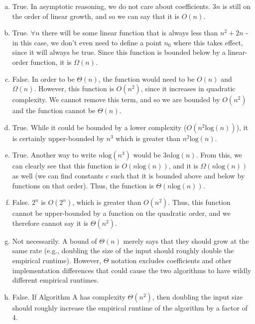 \documentclass[11pt]{article}
\begin{document}
\begin{enumerate}[(a)]
    	\item True. In asymptotic reasoning, we do not care about coefficients.
            $3n$ is still on the order of linear growth, and so we can say that
            it is $O(n)$.
	\item True. $\forall n$ there will be some linear function that is 
            always less than $n^2 + 2n$ - in this case, we don't even need to
            define a point $n_0$ where this takes effect, since it will always 
            be true. Since this function is bounded below by a linear-order
            function, it is $\Omega(n)$.
	\item False. In order to be $\Theta(n)$, the function would need to be
            $O(n)$ and $\Omega(n)$. However, this function is $O(n^2)$, since 
            it increases in quadratic complexity. We cannot remove this term, 
            and so we are bounded by $O(n^2)$ and the function cannot be
            $\Theta(n)$.
	\item True. While it could be bounded by a lower complexity
            ($O(n^2\text{log}(n))$), it is certainly upper-bounded by $n^3$ 
            which is greater than $n^2\text{log}(n)$.
    \item True. Another way to write $n\text{log}(n^3)$ would be
        $3n\text{log}(n)$. From this, we can clearly see that this function is
        $O(n\text{log}(n))$, and it is $\Omega(n\text{log}(n))$ as well (we can
        find constants $c$ such that it is bounded above and below by functions
        on that order). Thus, the function is $\Theta(n\text{log}(n))$.
	\item False. $2^n$ is $O(2^n)$, which is greater than $O(n^2)$. Thus,
            this function cannot be upper-bounded by a function on the quadratic
            order, and we therefore cannot say it is $\Theta(n^2)$.
	\item Not necessarily. A bound of $\Theta(n)$ merely says that they
            should grow at the same rate (e.g., doubling the size of the input
            should roughly double the empirical runtime). However, $\Theta$
            notation excludes coefficients and other implementation differences
            that could cause the two algorithms to have wildly different
            empirical runtimes.
	\item False. If Algorithm A has complexity $\Theta(n^2)$, then doubling
            the input size should roughly increase the empirical runtime of the
            algorithm by a factor of 4.
\end{enumerate}
\end{document}
